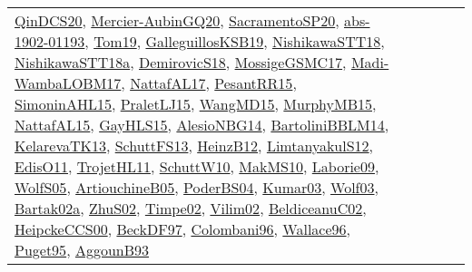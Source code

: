 {\begin{longtable}{lp{3cm}>{\raggedright}p{6cm}>{\raggedright}p{6cm}p{8cm}}
\href{articles/QinDCS20.pdf}{QinDCS20}\cite{QinDCS20}, \href{papers/Mercier-AubinGQ20.pdf}{Mercier-AubinGQ20}\cite{Mercier-AubinGQ20}, \href{articles/SacramentoSP20.pdf}{SacramentoSP20}\cite{SacramentoSP20}, \href{articles/abs-1902-01193.pdf}{abs-1902-01193}\cite{abs-1902-01193}, \href{papers/Tom19.pdf}{Tom19}\cite{Tom19}, \href{papers/GalleguillosKSB19.pdf}{GalleguillosKSB19}\cite{GalleguillosKSB19}, \href{papers/NishikawaSTT18.pdf}{NishikawaSTT18}\cite{NishikawaSTT18}, \href{papers/NishikawaSTT18a.pdf}{NishikawaSTT18a}\cite{NishikawaSTT18a}, \href{papers/DemirovicS18.pdf}{DemirovicS18}\cite{DemirovicS18}, \href{papers/MossigeGSMC17.pdf}{MossigeGSMC17}\cite{MossigeGSMC17}, \href{papers/Madi-WambaLOBM17.pdf}{Madi-WambaLOBM17}\cite{Madi-WambaLOBM17}, \href{articles/NattafAL17.pdf}{NattafAL17}\cite{NattafAL17}, \href{papers/PesantRR15.pdf}{PesantRR15}\cite{PesantRR15}, \href{articles/SimoninAHL15.pdf}{SimoninAHL15}\cite{SimoninAHL15}, \href{papers/PraletLJ15.pdf}{PraletLJ15}\cite{PraletLJ15}, \href{articles/WangMD15.pdf}{WangMD15}\cite{WangMD15}, \href{papers/MurphyMB15.pdf}{MurphyMB15}\cite{MurphyMB15}, \href{articles/NattafAL15.pdf}{NattafAL15}\cite{NattafAL15}, \href{papers/GayHLS15.pdf}{GayHLS15}\cite{GayHLS15}, \href{papers/AlesioNBG14.pdf}{AlesioNBG14}\cite{AlesioNBG14}, \href{papers/BartoliniBBLM14.pdf}{BartoliniBBLM14}\cite{BartoliniBBLM14}, \href{papers/KelarevaTK13.pdf}{KelarevaTK13}\cite{KelarevaTK13}, \href{papers/SchuttFS13.pdf}{SchuttFS13}\cite{SchuttFS13}, \href{papers/HeinzB12.pdf}{HeinzB12}\cite{HeinzB12}, \href{articles/LimtanyakulS12.pdf}{LimtanyakulS12}\cite{LimtanyakulS12}, \href{papers/EdisO11.pdf}{EdisO11}\cite{EdisO11}, \href{articles/TrojetHL11.pdf}{TrojetHL11}\cite{TrojetHL11}, \href{papers/SchuttW10.pdf}{SchuttW10}\cite{SchuttW10}, \href{papers/MakMS10.pdf}{MakMS10}\cite{MakMS10}, \href{papers/Laborie09.pdf}{Laborie09}\cite{Laborie09}, \href{papers/WolfS05.pdf}{WolfS05}\cite{WolfS05}, \href{papers/ArtiouchineB05.pdf}{ArtiouchineB05}\cite{ArtiouchineB05}, \href{articles/PoderBS04.pdf}{PoderBS04}\cite{PoderBS04}, \href{papers/Kumar03.pdf}{Kumar03}\cite{Kumar03}, \href{papers/Wolf03.pdf}{Wolf03}\cite{Wolf03}, \href{papers/Bartak02a.pdf}{Bartak02a}\cite{Bartak02a}, \href{papers/ZhuS02.pdf}{ZhuS02}\cite{ZhuS02}, \href{articles/Timpe02.pdf}{Timpe02}\cite{Timpe02}, \href{papers/Vilim02.pdf}{Vilim02}\cite{Vilim02}, \href{papers/BeldiceanuC02.pdf}{BeldiceanuC02}\cite{BeldiceanuC02}, \href{articles/HeipckeCCS00.pdf}{HeipckeCCS00}\cite{HeipckeCCS00}, \href{papers/BeckDF97.pdf}{BeckDF97}\cite{BeckDF97}, \href{papers/Colombani96.pdf}{Colombani96}\cite{Colombani96}, \href{articles/Wallace96.pdf}{Wallace96}\cite{Wallace96}, \href{papers/Puget95.pdf}{Puget95}\cite{Puget95}, \href{articles/AggounB93.pdf}{AggounB93}\cite{AggounB93}\\

\end{longtable}}
